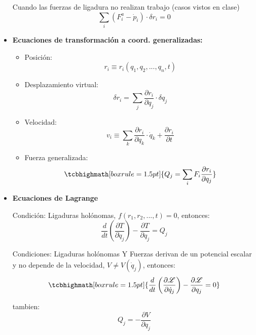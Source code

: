 \documentclass[14pt]{extarticle}
\newcommand{\Lagr}{\mathscr{L}}
\newcommand{\ddt}{\frac{d}{dt}}
\begin{document}
\begin{itemize}
{			Cuando las fuerzas de ligadura no realizan trabajo (casos vistos en clase)
			\begin{equation}
				\sum_i \left( F^{a}_i - \dot{p}_i \right) \cdot \delta r_i = 0
			\end{equation}
		}
		\item{ \textbf{Ecuaciones de transformación a coord. generalizadas:}

			\begin{itemize}
				\item Posición:			 
					\begin{equation}
							r_i \equiv r_i(q_1, q_2, ..., q_n, t)
					\end{equation}
				\item Desplazamiento virtual: 
					\begin{equation}
							\delta r_i = \sum_j \frac{\partial r_i}{\partial q_j} \cdot \delta q_j
					\end{equation}

				\item Velocidad: 
					\begin{equation}
							v_i \equiv \sum_k \frac{\partial r_i}{\partial q_k} \cdot \dot{q}_k + \frac{\partial r_i}{\partial t}
					\end{equation}
				\item Fuerza generalizada:
					\begin{equation}
						\tcbhighmath[boxrule=1.5pt]{Q_j = \sum_i F_i \frac{\partial r_i}{\partial q_j}}
					\end{equation}

			\end{itemize}
			}

		\item{ \textbf{Ecuaciones de Lagrange}

			Condición: Ligaduras holónomas, $f(r_1, r_2, ..., t) = 0$, entonces:
			\begin{equation}
				\ddt \left( \frac{\partial T}{\partial \dot{q}_j}\right) - \frac{\partial T}{\partial q_j} = Q_j
			\end{equation}

			Condiciones: Ligaduras holónomas Y Fuerzas derivan de un potencial escalar y no depende de la velocidad, $V \neq V(\dot{q}_j)$, entonces:
			\begin{equation}
				\tcbhighmath[boxrule=1.5pt]{\ddt \left( \frac{\partial \Lagr}{\partial \dot{q}_j}\right) - \frac{\partial \Lagr}{\partial q_j} = 0}
			\end{equation}

			tambien:
			\begin{equation}
				Q_j = -\frac{\partial V}{\partial q_j}
			\end{equation}

		}
		\end{itemize}
\end{document}
